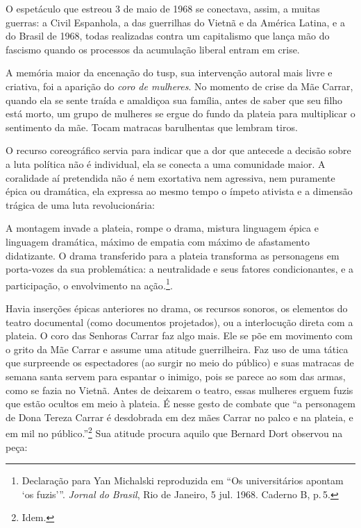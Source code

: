 O espetáculo que estreou 3 de maio de 1968 se conectava, assim, a muitas
guerras: a Civil Espanhola, a das guerrilhas do Vietnã e da América
Latina, e a do Brasil de 1968, todas realizadas contra um capitalismo
que lança mão do fascismo quando os processos da acumulação liberal
entram em crise.

\page

\subject{Coro das mulheres em armas}

A memória maior da encenação do {\sc tusp}, sua intervenção autoral mais livre
e criativa, foi a aparição do {\it coro de mulheres}. No momento de
crise da Mãe Carrar, quando ela se sente traída e amaldiçoa sua família,
antes de saber que seu filho está morto, um grupo de mulheres se ergue
do fundo da plateia para multiplicar o sentimento da mãe. Tocam matracas
barulhentas que lembram tiros.

O recurso coreográfico servia para indicar que a dor que antecede a
decisão sobre a luta política não é individual, ela se conecta a uma
comunidade maior. A coralidade aí pretendida não é nem exortativa nem
agressiva, nem puramente épica ou dramática, ela expressa ao mesmo tempo
o ímpeto ativista e a dimensão trágica de uma luta revolucionária:

\startblockquote
A montagem invade a plateia, rompe o drama, mistura linguagem épica e
linguagem dramática, máximo de empatia com máximo de afastamento
didatizante. O drama transferido para a plateia transforma as
personagens em porta-vozes da sua problemática: a neutralidade e seus
fatores condicionantes, e a participação, o envolvimento na
ação{\it .}\footnote{Declaração para Yan Michalski reproduzida em “Os
  universitários apontam ‘os fuzis'”. {\it Jornal do Brasil}, Rio de
  Janeiro, 5 jul. 1968. Caderno B, p.\,5.}.
\stopblockquote

Havia inserções épicas anteriores no drama, os recursos sonoros, os
elementos do teatro documental (como documentos projetados), ou a
interlocução direta com a plateia. O coro das Senhoras Carrar faz algo
mais. Ele se põe em movimento com o grito da Mãe Carrar e assume uma
atitude guerrilheira. Faz uso de uma tática que surpreende os
espectadores (ao surgir no meio do público) e suas matracas de semana
santa servem para espantar o inimigo, pois se parece ao som das armas,
como se fazia no Vietnã. Antes de deixarem o teatro, essas mulheres
erguem fuzis que estão ocultos em meio à plateia. É nesse gesto de
combate que “a personagem de Dona Tereza Carrar é desdobrada em dez mães
Carrar no palco e na plateia, e em mil no público.”\footnote{Idem.} Sua
atitude procura aquilo que Bernard Dort observou na peça:

